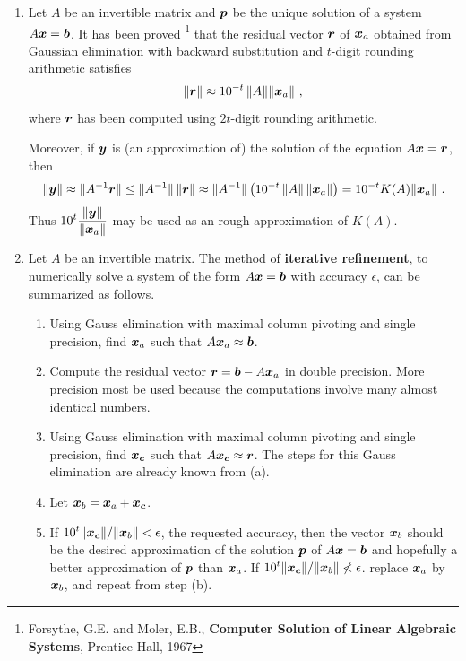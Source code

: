 \begin{rmkList}
\begin{enumerate}
\item Let $A$ be an invertible \nn matrix and $\bm{p}$ be
the unique solution of a system $A\bm{x} = \bm{b}$.  It has been
proved \footnote{Forsythe, G.E. and Moler, E.B., {\bfseries Computer
Solution of Linear Algebraic Systems}, Prentice-Hall, 1967} that the
residual vector $\bm{r}$ of $\bm{x}_a$ obtained from Gaussian
elimination with backward substitution and $t$-digit rounding arithmetic
satisfies
\[
\| \bm{r} \| \approx 10^{-t} \, \|A\| \| \bm{x}_a \| \ ,
\]
where $\bm{r}$ has been computed using $2t$-digit rounding arithmetic.

Moreover, if $\bm{y}$ is (an approximation of) the solution of the
equation $A\bm{x} = \bm{r}$, then
\[
\|\bm{y}\| \approx \|A^{-1} \bm{r}\| \leq \|A^{-1}\|\, \|\bm{r}\|
\approx \|A^{-1}\|\left( 10^{-t} \, \|A\|\, \| \bm{x}_a \| \right)
= 10^{-t} K(A) \|\bm{x}_a\| \ .
\]
Thus
$\displaystyle 10^t \frac{\|\bm{y}\|}{\|\bm{x}_a\|}$ may be used as
an rough approximation of $K(A)$.
\item Let $A$ be an invertible matrix.  The method of
{\bfseries iterative refinement}, to
numerically solve a system of the form $A\bm{x}=\bm{b}$ with
accuracy $\epsilon$, can be summarized as follows.
\begin{enumerate}
\item Using Gauss elimination with maximal column pivoting and single
precision, find $\bm{x}_a$ such that $A\bm{x}_a \approx \bm{b}$.
\item Compute the residual vector $\bm{r} = \bm{b}-A\bm{x}_a$ in
double precision.  More precision most be used because the
computations involve many almost identical numbers.
\item Using Gauss elimination with maximal column pivoting and single
precision, find $\bm{x_c}$ such that $A\bm{x_c} \approx \bm{r}$.
The steps for this Gauss elimination are already known from (a).
\item Let $\bm{x}_b = \bm{x}_a + \bm{x_c}$.
\item If $\displaystyle 10^t \|\bm{x_c}\|/\|\bm{x}_b\| < \epsilon$, the
requested accuracy, then the vector $\bm{x}_b$ should be the desired
approximation of the solution $\bm{p}$ of $A\bm{x}=\bm{b}$ and
hopefully a better approximation of $\bm{p}$ than $\bm{x}_a$.
If $\displaystyle 10^t \|\bm{x_c}\|/\|\bm{x}_b\| \not< \epsilon$.
replace $\bm{x}_a$ by $\bm{x}_b$, and repeat from step (b).
\end{enumerate}
\end{enumerate}
\end{rmkList}

